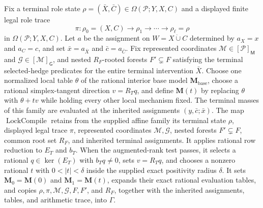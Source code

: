 Fix a terminal role state \(\rho=(\bar X,\bar C)\in\Omega(\mathcal P;Y,X,C)\) and a displayed finite legal role trace
\[
 \pi:\rho_0=(X,C)\longrightarrow\rho_1\longrightarrow\cdots\longrightarrow\rho_\ell=\rho
\]
in \(\Omega(\mathcal P;Y,X,C)\). Let \(a\) be the assignment on \(W=X\mathbin{\dot\cup}C\) determined by \(a_X=x\) and \(a_C=c\), and set \(\bar x=a_{\bar X}\) and \(\bar c=a_{\bar C}\). Fix represented coordinates \(\mathcal M\in[\mathcal P]_{\mathsf M}\) and \(\mathcal G\in[\mathcal M]_{\mathsf G}\), and nested \(R_F\)-rooted forests \(F'\subsetneq F\) satisfying the terminal selected-hedge predicates for the entire terminal intervention \(\bar X\). Choose one normalized local table \(\theta\) of the rational interior base model \(\mathbf M_{\mathrm{base}}\), choose a rational simplex-tangent direction \(v=R_Tq\), and define \(\mathbf M(t)\) by replacing \(\theta\) with \(\theta+t v\) while holding every other local mechanism fixed. The terminal masses of this family are evaluated at the inherited assignments \((y,\bar c;\bar x)\).
The map \(\operatorname{LockCompile}\) retains from the supplied affine family its terminal state \(\rho\), displayed legal trace \(\pi\), represented coordinates \(\mathcal M,\mathcal G\), nested forests \(F'\subsetneq F\), common root set \(R_F\), and inherited terminal assignments. It applies rational row reduction to \(E_T\) and \(b_T\). When the augmented-rank test passes, it selects a rational \(q\in\ker(E_T)\) with \(b_Tq\neq0\), sets \(v=R_Tq\), and chooses a nonzero rational \(t\) with \(0<|t|<\delta\) inside the supplied exact positivity radius \(\delta\). It sets \(\mathbf M_0=\mathbf M(0)\) and \(\mathbf M_1=\mathbf M(t)\), expands their exact rational evaluation tables, and copies \(\rho,\pi,\mathcal M,\mathcal G,F,F'\), and \(R_F\), together with the inherited assignments, tables, and arithmetic trace, into \(\Gamma\).
